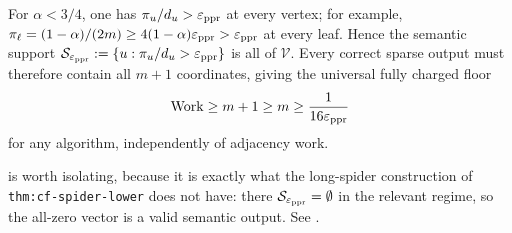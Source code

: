 \begin{observation}
\label{obs:ladder-nontrivial}
For $\alpha<3/4$, one has $\pi_u/d_u>\varepsilon_{\mathrm{ppr}}$ at every vertex; for example,
$\pi_\ell=(1-\alpha)/(2m)\ge4(1-\alpha)\varepsilon_{\mathrm{ppr}}>\varepsilon_{\mathrm{ppr}}$ at every leaf.
Hence the semantic support
$\mathcal S_{\varepsilon_{\mathrm{ppr}}}:=\{u:\pi_u/d_u>\varepsilon_{\mathrm{ppr}}\}$ is all of
$\mathcal V$. Every correct sparse output must therefore contain all $m+1$
coordinates, giving the universal fully charged floor
\begin{equation}
    \operatorname{Work}\ge m+1\ge m\ge\frac{1}{16\varepsilon_{\mathrm{ppr}}}
    \label{eq:ladder-output-floor}
\end{equation}
for any algorithm, independently of adjacency work.
\end{observation}

\noindent
{} is worth isolating, because it is exactly what
the long-spider construction of \texttt{thm:cf-spider-lower} does not have:
there $\mathcal S_{\varepsilon_{\mathrm{ppr}}}=\emptyset$ in the relevant regime, so the all-zero
vector is a valid semantic output. See
.
